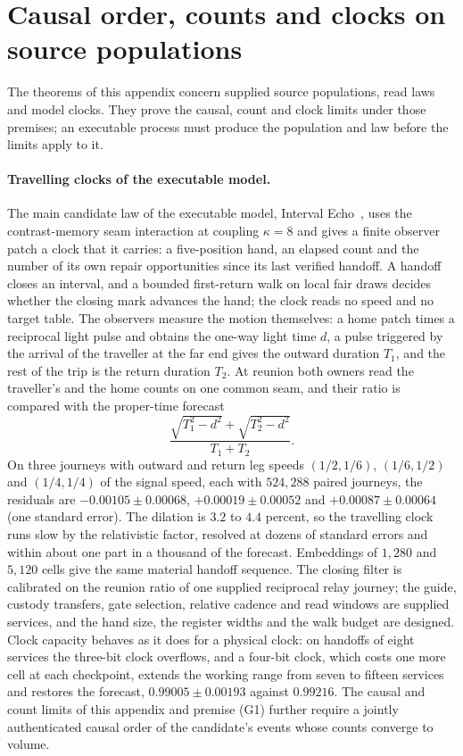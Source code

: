 \documentclass[11pt]{article}
\begin{document}
\section{Causal order, counts and clocks on source populations}
\label{app:source-causal-order}

The theorems of this appendix concern supplied source populations, read laws
and model clocks. They prove the causal, count and clock limits under those
premises; an executable process must produce the population and law before
the limits apply to it.

\paragraph{Travelling clocks of the executable model.}
The main candidate law of the executable model, Interval Echo~\cite{ophmodel},
uses the contrast-memory seam interaction at coupling $\kappa=8$ and gives a
finite observer patch a clock that it carries: a five-position hand, an
elapsed count and the number of its own repair opportunities since its last
verified handoff. A handoff closes an interval, and a bounded first-return
walk on local fair draws decides whether the closing mark advances the hand;
the clock reads no speed and no target table. The observers measure the
motion themselves: a home patch times a reciprocal light pulse and obtains
the one-way light time $d$, a pulse triggered by the arrival of the
traveller at the far end gives the outward duration $T_1$, and the rest of
the trip is the return duration $T_2$. At reunion both owners read the
traveller's and the home counts on one common seam, and their ratio is
compared with the proper-time forecast
\[
 \frac{\sqrt{T_1^2-d^2}+\sqrt{T_2^2-d^2}}{T_1+T_2}.
\]
On three journeys with outward and return leg speeds $(1/2,1/6)$,
$(1/6,1/2)$ and $(1/4,1/4)$ of the signal speed, each with $524{,}288$
paired journeys, the residuals
are ${-0.00105\pm0.00068}$, ${+0.00019\pm0.00052}$ and ${+0.00087\pm0.00064}$ (one
standard error). The dilation is $3.2$ to $4.4$ percent, so the travelling
clock runs slow by the relativistic factor, resolved at dozens of standard
errors and within about one part in a thousand of the forecast. Embeddings
of $1{,}280$ and $5{,}120$ cells give the same material handoff sequence. The
closing filter is calibrated on the reunion ratio of one supplied reciprocal
relay journey; the guide, custody transfers, gate selection, relative
cadence and read windows are supplied services, and the hand size, the
register widths and the walk budget are designed. Clock capacity behaves as
it does for a physical clock: on handoffs of eight services the three-bit
clock overflows, and a four-bit clock, which costs one more cell at each
checkpoint, extends the working range from seven to fifteen services and
restores the forecast, ${0.99005\pm0.00193}$ against $0.99216$. The causal and
count limits of this appendix and premise (G1) further require a jointly
authenticated causal order of the candidate's events whose counts converge
to volume.
\end{document}
